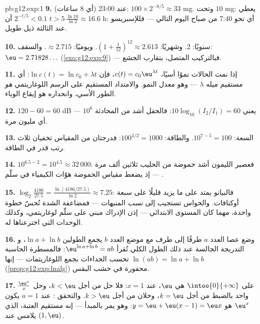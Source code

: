 \begin{solution}{pb:g12:exp:1}
\textbf{9.} عند 23:00 (أي $8$ ساعات):
$100 \times 2^{-8/5} \approx 33$ mg. وتحت $10$ mg:
يعطي $2^{-t/5} < 0.1$ أن $t > 5\,\frac{\ln 10}{\ln 2} \approx
16.6$ h: أي نحو 7:40 من صباح اليوم التالي --- فللإسبريسو عند
الثالثة ذيل طويل.

\textbf{10.} سنويًا: $2$. وشهريًا:
$\left(1 + \frac{1}{12}\right)^{12} \approx 2.613$. ويوميًا:
$\approx 2.715$. والسقف: $\eu = 2.71828\ldots$
(\cref{exo:g12:exp:9}) --- فبالتركيب المتصل، يتقارب
الجشع.

\textbf{11.} إذا نمت الحالات نموًا أسيًا، $c(t) = c_0
\eu^{\lambda t}$، فإن $\ln c(t) = \ln c_0 + \lambda t$: أي
مستقيم ميله $\lambda$ --- وهو معدل النمو. والامتداد
المستقيم على الرسم اللوغاريتمي \emph{هو} الطور
الأسي، وانحداره هو إيقاع الوباء.

\textbf{12.} $120 - 60 = 60$ dB يعني
$10\log_{10}(I_2/I_1) = 60$: فالحفل أشد من
المحادثة $10^6$ --- أي مليون مرة.

\textbf{13.} السعة: $10^{7-5} = 100$. والطاقة:
$100^{3/2} = 1000$: فدرجتان من المقياس تخفيان ثلاث رتب
قدر في الطاقة.

\textbf{14.} $10^{6.5 - 2} = 10^{4.5} \approx 32\,000$: فعصير الليمون
أشد حموضة من الحليب ثلاثين ألف مرة --- إذ يضغط مقياس
الحموضة هوّات الكيمياء في سلّم .

\textbf{15.} $\log_2\!\frac{4186}{27.5} =
\frac{\ln(4186/27.5)}{\ln 2} \approx 7.25$: فالبيانو يمتد على ما يزيد
قليلًا على سبعة أوكتافات. والحواس تستجيب إلى \emph{نسب} المنبهات
--- فمضاعفة الشدة تُحسّ خطوة واحدة، مهما كان
المستوى الابتدائي --- إذن الإدراك مبني على سلّم
لوغاريتمي، وكذلك الوحدات التي اخترعناها له.

\textbf{16.} وضع عصا العدد $a$ طرفًا إلى طرف مع
موضع العدد $b$ يجمع الطولين $\ln a + \ln b$، و
التدريجة الجالسة عند ذلك الطول الكلي تُقرأ
$\eu^{\ln a + \ln b} = ab$: فالمسطرة الحاسبة تحسب الجداءات
بجمع اللوغاريتمات --- إنها $\ln(ab) = \ln a + \ln b$
(\cref{prop:g12:exp:lnalg}) محفورة في خشب البقس.

\textbf{17.}   $\frac{\eu^x}{x}$ على
$\intoo{0}{+\infty}$ هي $\eu$، عند $x = 1$: فلا حل من أجل
$k < \eu$، وحل واحد بالضبط من أجل $k = \eu$، وحلان من أجل $k > \eu$.
والتحقق : عند $a = 1$ يكون   $\eu^x$ هو
$y = \eu + \eu(x - 1) = \eu x$: وهو يمر بالمبدأ
--- إنه مستقيم العتبة، الذي يلامس  عند $(1, \eu)$.


\end{solution}
